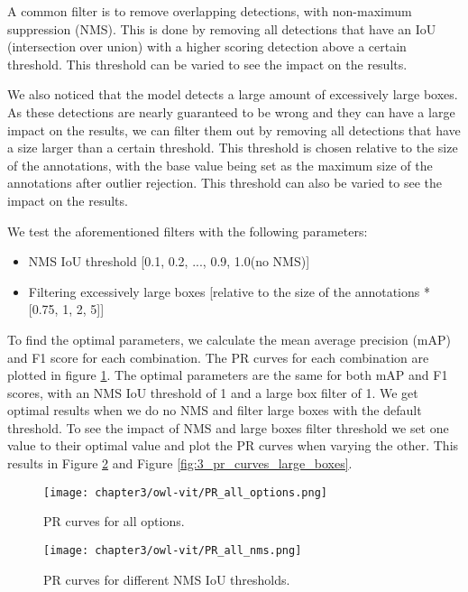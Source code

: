 A common filter is to remove overlapping detections, with non-maximum suppression (NMS). This is done by removing all detections that have an IoU (intersection over union) with a higher scoring detection above a certain threshold. This threshold can be varied to see the impact on the results.

We also noticed that the model detects a large amount of excessively large boxes. As these detections are nearly guaranteed to be wrong and they can have a large impact on the results, we can filter them out by removing all detections that have a size larger than a certain threshold. This threshold is chosen relative to the size of the annotations, with the base value being set as the maximum size of the annotations after outlier rejection. This threshold can also be varied to see the impact on the results. 

We test the aforementioned filters with the following parameters:
\begin{itemize}
    \item NMS IoU threshold [0.1, 0.2, ..., 0.9, 1.0(no NMS)]
    \item Filtering excessively large boxes [relative to the size of the annotations * [0.75, 1, 2, 5]]
\end{itemize}
To find the optimal parameters, we calculate the mean average precision (mAP) and F1 score for each combination. The PR curves for each combination are plotted in figure \ref{fig:3_pr_curves_all_options}. The optimal parameters are the same for both mAP and F1 scores, with an NMS IoU threshold of 1 and a large box filter of 1. We get optimal results when we do no NMS and filter large boxes with the default threshold. To see the impact of NMS and large boxes filter threshold we set one value to their optimal value and plot the PR curves when varying the other. This results in Figure \ref{fig:3_pr_curves_nms} and Figure \ref{fig:3_pr_curves_large_boxes}.

\begin{figure}[h]
    \centering
    \texttt{[image: chapter3/owl-vit/PR\_all\_options.png]}
    \caption{PR curves for all options.}
    \label{fig:3_pr_curves_all_options}
\end{figure}

\begin{figure}[h]
    \centering
    \texttt{[image: chapter3/owl-vit/PR\_all\_nms.png]}
    \caption{PR curves for different NMS IoU thresholds.}
    \label{fig:3_pr_curves_nms}
\end{figure}

